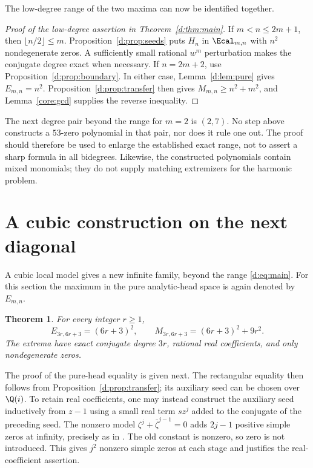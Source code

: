 \documentclass[UTF8,11pt]{ctexart}
\newtheorem{thm}{Theorem}[section]
\theoremstyle{definition}
\numberwithin{equation}{section}
\begin{document}
The low-degree range of the two maxima can now be identified together.
\begin{proof}[Proof of the low-degree assertion in Theorem~\ref{d:thm:main}]
If $m<n\le2m+1$, then $\lfloor n/2\rfloor\le m$.
Proposition~\ref{d:prop:seeds} puts $H_n$ in $\Ecal_{m,n}$ with $n^2$
nondegenerate zeros. A sufficiently small rational $w^m$ perturbation
makes the conjugate degree exact when necessary. If $n=2m+2$, use
Proposition~\ref{d:prop:boundary}. In either case, Lemma~\ref{d:lem:pure}
gives $E_{m,n}=n^2$.
Proposition~\ref{d:prop:transfer} then gives $M_{m,n}\ge n^2+m^2$, and
Lemma~\ref{core:gcd} supplies the reverse inequality.
\end{proof}

The next degree pair beyond the range for $m=2$ is $(2,7)$. No step above
constructs a $53$-zero polynomial in that pair, nor does it rule one out.
The proof should therefore be used to enlarge the established exact
range, not to assert a sharp formula in all bidegrees. Likewise, the
constructed polynomials contain mixed monomials; they do not supply
matching extremizers for the harmonic problem.

\section{A cubic construction on the next diagonal}\label{c:sec:cubic}
A cubic local model gives a new infinite family, beyond the range
\eqref{d:eq:main}. For this section the maximum in the pure analytic-head
space is again denoted by $E_{m,n}$.
\begin{thm}\label{c:thm:main}
For every integer $r\ge1$,
\begin{equation}\label{c:eq:main}
 E_{3r,6r+3}=(6r+3)^2,\qquad
 M_{3r,6r+3}=(6r+3)^2+9r^2.
\end{equation}
The extrema have exact conjugate degree $3r$, rational real coefficients,
and only nondegenerate zeros.
\end{thm}
The proof of the pure-head equality is given next. The rectangular
equality then follows from Proposition~\ref{d:prop:transfer}; its
auxiliary seed can be chosen over $\Q(i)$. To retain real coefficients,
one may instead construct the auxiliary seed inductively from $z-1$
using a small real term $s z^j$ added to the conjugate of the preceding
seed. The nonzero model $\zeta^j+\bar\zeta^{j-1}=0$ adds $2j-1$
positive simple zeros at infinity, precisely as in
\cite[proof of Theorem~4.1, pp.~12--14]{SZ24}. The old constant is
nonzero, so zero is not introduced. This gives $j^2$ nonzero simple
zeros at each stage and justifies the real-coefficient assertion.
\end{document}
